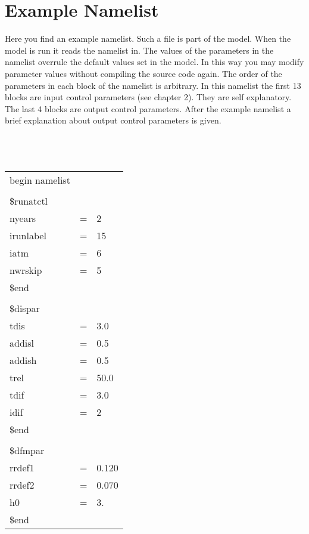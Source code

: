 \section{Example Namelist}
Here you find an example namelist. Such a file is part of the model. When 
the model is run it reads the namelist in. The values of the parameters in the namelist 
overrule the default values set in the model. In this way you may modify parameter values
without compiling the source code again. The order of the parameters in each block of the
namelist is arbitrary.
In this namelist the first 13 blocks are input control parameters (see chapter 2). They
are self explanatory. The last 4 blocks are output control parameters.
After the example namelist a brief explanation about output control parameters is
given.  \\
\\
\\
\\
\begin{tabular}{lll}
begin namelist      \\
                    \\
\$runatctl          \\
 nyears    & = & 2  \\
 irunlabel & = & 15 \\
 iatm      & = & 6  \\
 nwrskip   & = & 5  \\
\$end               \\
                    \\
\$dispar            \\
 tdis   &  = & 3.0  \\
 addisl &  = & 0.5  \\
 addish &  = & 0.5  \\
 trel   &  = & 50.0 \\
 tdif   &  = & 3.0  \\
 idif   &  = & 2    \\
\$end               \\
                    \\
\$dfmpar            \\
 rrdef1 &  = &  0.120 \\
 rrdef2 &  = &  0.070 \\
 h0     &  = &  3.    \\
\$end                 \\
\end{tabular}

